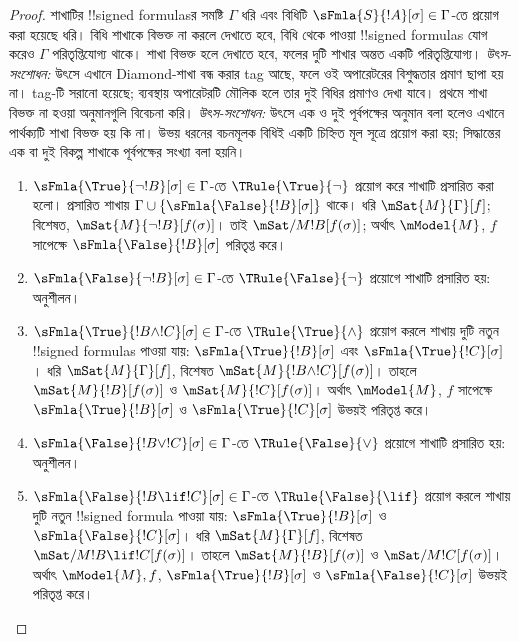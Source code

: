 \documentclass[../../../include/open-logic-section]{subfiles}
\begin{document}
\begin{proof}
শাখাটির !!{signed formula}sর সমষ্টি $\Gamma$ ধরি এবং
বিধিটি $\sFmla{S}{!A}[\sigma] \in \Gamma$-তে প্রয়োগ করা হয়েছে
ধরি। বিধি শাখাকে বিভক্ত না করলে দেখাতে হবে, বিধি থেকে পাওয়া
!!{signed formula}s
যোগ করেও $\Gamma$ পরিতৃপ্তিযোগ্য থাকে। শাখা বিভক্ত হলে দেখাতে
হবে, ফলের দুটি শাখার অন্তত একটি পরিতৃপ্তিযোগ্য।
\emph{উৎস-সংশোধন:} উৎসে এখানে Diamond-শাখা বন্ধ করার tag আছে, ফলে ওই অপারেটরের বিশুদ্ধতার প্রমাণ ছাপা হয় না। tag-টি সরানো হয়েছে; ব্যবস্থায় অপারেটরটি মৌলিক হলে তার দুই বিধির প্রমাণও দেখা যাবে।
প্রথমে শাখা বিভক্ত না হওয়া অনুমানগুলি বিবেচনা করি।
\emph{উৎস-সংশোধন:} উৎসে এক ও দুই পূর্বপক্ষের অনুমান বলা হলেও এখানে পার্থক্যটি শাখা বিভক্ত হয় কি না। উভয় ধরনের বচনমূলক বিধিই একটি চিহ্নিত মূল সূত্রে প্রয়োগ করা হয়; সিদ্ধান্তের এক বা দুই বিকল্প শাখাকে পূর্বপক্ষের সংখ্যা বলা হয়নি।
\begin{enumerate}
\item $\sFmla{\True}{\lnot !B}[\sigma] \in \Gamma$-তে
  $\TRule{\True}{\lnot}$ প্রয়োগ করে শাখাটি প্রসারিত করা হলো।
  প্রসারিত শাখায় $\Gamma \cup
  \{\sFmla{\False}{!B}[\sigma]\}$ থাকে। ধরি
  $\mSat{M}{\Gamma}[f]$; বিশেষত,
  $\mSat{M}{\lnot !B}[f(\sigma)]$। তাই
  $\mSat/{M}{!B}[f(\sigma)]$; অর্থাৎ $\mModel{M}$,
  $f$ সাপেক্ষে $\sFmla{\False}{!B}[\sigma]$ পরিতৃপ্ত করে।
\item $\sFmla{\False}{\lnot !B}[\sigma] \in \Gamma$-তে
  $\TRule{\False}{\lnot}$ প্রয়োগে শাখাটি প্রসারিত হয়:
  অনুশীলন।
\item $\sFmla{\True}{!B \land !C}[\sigma] \in \Gamma$-তে
  $\TRule{\True}{\land}$ প্রয়োগ করলে শাখায় দুটি নতুন
  !!{signed formula}s পাওয়া যায়:
  $\sFmla{\True}{!B}[\sigma]$ এবং $\sFmla{\True}{!C}[\sigma]$।
  ধরি $\mSat{M}{\Gamma}[f]$, বিশেষত
  $\mSat{M}{!B \land !C}[f(\sigma)]$। তাহলে
  $\mSat{M}{!B}[f(\sigma)]$ ও
  $\mSat{M}{!C}[f(\sigma)]$। অর্থাৎ $\mModel{M}$,
  $f$ সাপেক্ষে $\sFmla{\True}{!B}[\sigma]$ ও
  $\sFmla{\True}{!C}[\sigma]$ উভয়ই পরিতৃপ্ত করে।
\item $\sFmla{\False}{!B \lor !C}[\sigma] \in \Gamma$-তে
  $\TRule{\False}{\lor}$ প্রয়োগে শাখাটি প্রসারিত হয়:
  অনুশীলন।
\item $\sFmla{\False}{!B \lif !C}[\sigma] \in \Gamma$-তে
  $\TRule{\False}{\lif}$ প্রয়োগ করলে শাখায় দুটি নতুন
  !!{signed formula} পাওয়া যায়:
  $\sFmla{\True}{!B}[\sigma]$ ও
  $\sFmla{\False}{!C}[\sigma]$। ধরি
  $\mSat{M}{\Gamma}[f]$, বিশেষত
  $\mSat/{M}{!B \lif !C}[f(\sigma)]$। তাহলে
  $\mSat{M}{!B}[f(\sigma)]$ ও
  $\mSat/{M}{!C}[f(\sigma)]$। অর্থাৎ
  $\mModel{M}, f$,
  $\sFmla{\True}{!B}[\sigma]$ ও
  $\sFmla{\False}{!C}[\sigma]$ উভয়ই পরিতৃপ্ত করে।


\end{enumerate}
\end{proof}
\end{document}
